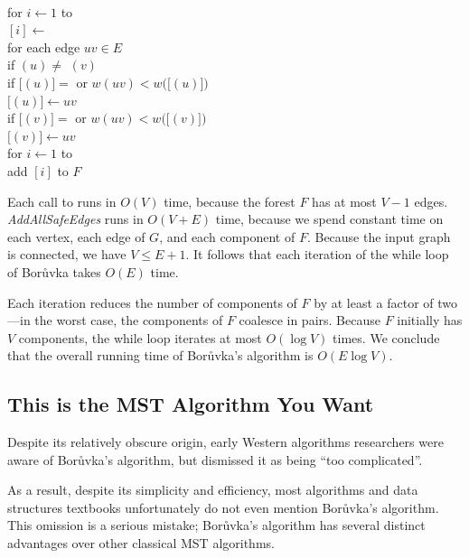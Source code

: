 \begin{pseudocode}
\\
for $i \gets 1$ to \\
\Indent {}$[i] \gets$  \\
for each edge $uv \in E$\\
\Indent if $(u) \neq$  $(v)$\\
\Indent\Indent if $[$$(u)] =$  or $w(uv) < w($$[$$(u)])$\\
\Indent\Indent\Indent {}$[$$(u)] \gets uv$\\
\Indent\Indent if $[$$(v)] =$  or $w(uv) < w($$[$$(v)])$\\
\Indent\Indent\Indent {}$[$$(v)] \gets uv$\\
for $i \gets 1$ to \\
\Indent add $[i]$ to $F$
\end{pseudocode}

Each call to  runs in $O(V)$ time, because the forest $F$ has at most $V-1$ edges. \textit{AddAllSafeEdges} runs in $O(V+ E)$ time, because we spend constant time on each vertex, each edge of $G$, and each component of $F$. Because the input graph is connected, we have $V\le E + 1$. It follows that each iteration of the while loop of Borůvka takes $O(E)$ time.

Each iteration reduces the number of components of $F$ by at least a factor of two—in the worst case, the components of $F$ coalesce in pairs. Because $F$ initially has $V$ components, the while loop iterates at most $O(\log  V)$ times. We conclude that the overall running time of Borůvka’s algorithm is $O(E \log  V)$.

\subsection{This is the MST Algorithm You Want}
Despite its relatively obscure origin, early Western algorithms researchers were aware of Borůvka’s algorithm, but dismissed it as being “too complicated”.

As a result, despite its simplicity and efficiency, most algorithms and data structures textbooks unfortunately do not even mention Borůvka’s algorithm. This omission is a serious mistake; Borůvka’s algorithm has several distinct advantages over other classical MST algorithms.

